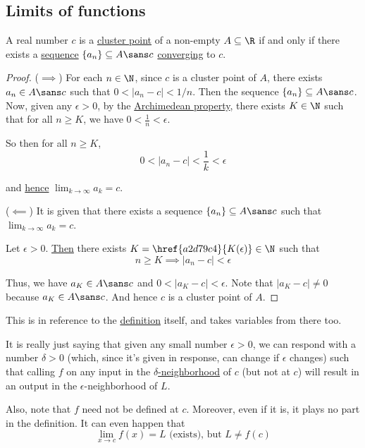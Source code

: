 \subsection{Limits of functions}\label{dfdd630}

\label{e46288b}

A real number $c$ is a \href{b0219cd}{cluster point} of a non-empty
$A\subseteq\R$ if and only if there exists a \href{b5fa0e4}{sequence}
$\{a_n\}\subseteq A\sans c$ \href{de3e28a}{converging} to $c$.

\begin{proof}
  ($\implies$) For each $n\in\N$, since $c$ is a cluster point of $A$, there
  exists $a_n\in A\sans c$ such that $0<|a_n-c|<1/n$. Then the sequence
  $\{a_n\}\subseteq A\sans c$. Now, given any $\epsilon>0$, by the
  \href{d845856}{Archimedean property}, there exists $K\in\N$ such that for all
  $n\geq K$, we have $0<\frac1n<\epsilon$.

  So then for all $n\geq K$,
  $$
    0<|a_n-c|<\frac1k<\epsilon
  $$

  and \href{e565120}{hence} $\displaystyle\lim_{k\to\infty}a_k=c$.

  ($\impliedby$) It is given that there exists a sequence $\{a_n\}\subseteq
  A\sans c$ such that $\displaystyle\lim_{k\to\infty}a_k=c $.

  Let $\epsilon>0$. \href{e565120}{Then} there exists
  $K=\href{a2d79c4}{K(\epsilon)}\in\N$ such that
  $$
    n\geq K\implies |a_n-c|<\epsilon
  $$

  Thus, we have $a_K\in A\sans c$ and $0<|a_K-c|<\epsilon$. Note that
  $|a_K-c|\neq0$ because $a_K\in A\sans c$. And hence $c$ is a cluster point of
  $A$.
\end{proof}

\label{d6555f4}

This is in reference to the \href{d2d461a}{definition} itself, and takes
variables from there too.

It is really just saying that given any small number $\epsilon>0$, we can
respond with a number $\delta>0$ (which, since it's given in response, can
change if $\epsilon$ changes) such that calling $f$ on any input in the
\href{ba35f12}{$\delta$-neighborhood} of $c$ (but not at $c$) will result in an
output in the $\epsilon$-neighborhood of $L$.

Also, note that $f$ need not be defined at $c$. Moreover, even if it is, it
plays no part in the definition. It can even happen that
$$
  \lim_{x\to c}f(x)=L\text{ (exists), but }L\neq f(c)
$$

